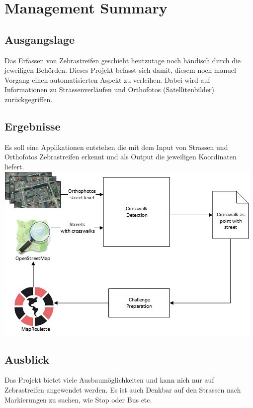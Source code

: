\chapter{Management Summary}
\section{Ausgangslage}
Das Erfassen von Zebrastreifen geschieht heutzutage noch händisch durch die jeweiligen Behörden.
Dieses Projekt befasst sich damit, diesem noch manuel Vorgang einen automatisierten Aspekt zu verleihen.
Dabei wird auf Informationen zu Strassenverläufen und Orthofotos (Satellitenbilder) zurückgegriffen. 
\section{Ergebnisse}
Es soll eine Applikationen entstehen die mit dem Input von Strassen und Orthofotos Zebrastreifen erkennt und als Output die jeweiligen Koordinaten liefert.
\includegraphics[width=\textwidth]{images/management_summary_1.png}
\section{Ausblick}
Das Projekt bietet viele Ausbaumöglichkeiten und kann nich nur auf Zebrastreifen angewendet werden. Es ist auch Denkbar auf den Strassen nach Markierungen zu suchen, wie Stop oder Bus etc.